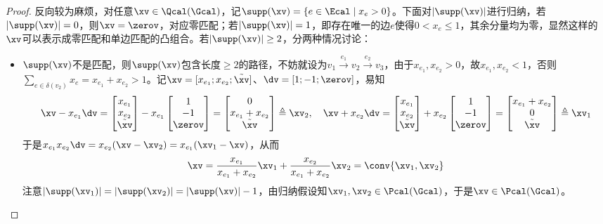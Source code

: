 \documentclass{ctexart}
\begin{document}
\begin{proof}
    反向较为麻烦，对任意$\xv \in \Qcal (\Gcal)$，记$\supp(\xv) = \{ e \in \Ecal \mid x_e > 0 \}$。下面对$|\supp(\xv)|$进行归纳，若$|\supp(\xv)| = 0$，则$\xv = \zerov$，对应零匹配；若$|\supp(\xv)| = 1$，即存在唯一的边$e$使得$0 < x_e \le 1$，其余分量均为零，显然这样的$\xv$可以表示成零匹配和单边匹配的凸组合。若$|\supp(\xv)| \ge 2$，分两种情况讨论：
    \begin{itemize}
        \item $\supp(\xv)$不是匹配，则$\supp(\xv)$包含长度$\ge 2$的路径，不妨就设为$v_1 \xrightarrow{e_1} v_2 \xrightarrow{e_2} v_3$，由于$x_{e_1}, x_{e_2} > 0$，故$x_{e_1}, x_{e_2} < 1$，否则$\sum_{e \in \delta(v_2)} x_e = x_{e_1} + x_{e_2} > 1$。记$\xv = [x_{e_1};x_{e_2};\tilde{\xv}]$、$\dv = [1;-1;\zerov]$，易知
              \begin{align*}
                  \xv - x_{e_1} \dv = \begin{bmatrix} x_{e_1} \\ x_{e_2} \\ \tilde{\xv} \end{bmatrix} - x_{e_1} \begin{bmatrix} 1 \\ -1 \\ \zerov \end{bmatrix} = \begin{bmatrix} 0 \\ x_{e_1} + x_{e_2} \\ \tilde{\xv} \end{bmatrix} \triangleq \xv_2, \quad \xv + x_{e_2} \dv = \begin{bmatrix} x_{e_1} \\ x_{e_2} \\ \tilde{\xv} \end{bmatrix} + x_{e_2} \begin{bmatrix} 1 \\ -1 \\ \zerov \end{bmatrix} = \begin{bmatrix} x_{e_1} + x_{e_2} \\ 0 \\ \tilde{\xv} \end{bmatrix} \triangleq \xv_1
              \end{align*}
              于是$x_{e_1} x_{e_2} \dv = x_{e_2} (\xv - \xv_2) = x_{e_1} (\xv_1 - \xv)$，从而
              \begin{align*}
                  \xv = \frac{x_{e_1}}{x_{e_1} + x_{e_2}} \xv_1 + \frac{x_{e_2}}{x_{e_1} + x_{e_2}} \xv_2 = \conv\{ \xv_1, \xv_2 \}
              \end{align*}
              注意$|\supp(\xv_1)| = |\supp(\xv_2)| = |\supp(\xv)| - 1$，由归纳假设知$\xv_1,\xv_2 \in \Pcal(\Gcal)$，于是$\xv \in \Pcal(\Gcal)$。


\end{itemize}
\end{proof}
\end{document}
